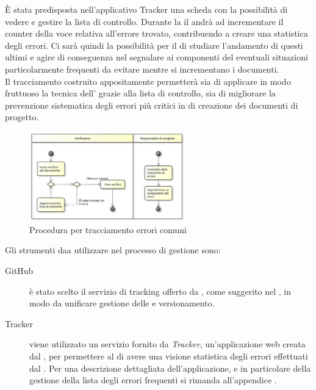				\label{sec:tracciamento}
					È stata predisposta nell'applicativo Tracker una scheda con la possibilità di vedere e gestire la lista di controllo. Durante la  il  andrà ad incrementare il counter della voce relativa all'errore trovato, contribuendo a creare una statistica degli errori. Ci sarà quindi la possibilità per il  di studiare l'andamento di questi ultimi e agire di conseguenza nel segnalare ai componenti del  eventuali situazioni particolarmente frequenti da evitare mentre si incrementano i documenti.\\ Il tracciamento costruito appositamente permetterà sia di applicare in modo fruttuoso la tecnica dell'\textit{} grazie alla lista di controllo, sia di migliorare la prevenzione sistematica degli errori più critici in  di creazione dei documenti di progetto.
					\begin{figure}[H]
							\centering
							\includegraphics[width=0.6\textwidth]{NormeDiProgetto/Pics/ProceduraDecrementoErrori}
							\caption{Procedura per tracciamento errori comuni}
					\end{figure}
			Gli strumenti daa utilizzare nel processo di gestione sono:
			\begin{description}
				\item[GitHub] è stato scelto il servizio di  tracking offerto da , come suggerito nel , in modo da unificare gestione delle  e versionamento.
				\item[Tracker] viene utilizzato un servizio fornito da \textit{Tracker}, un'applicazione web creata dal \groupname, per permettere al  di avere una visione statistica degli errori effettuati dal . Per una descrizione dettagliata dell'applicazione, e in particolare della gestione della lista degli errori frequenti si rimanda all'appendice .
			\end{description}
			
			
